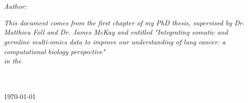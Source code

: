 \documentclass[
12pt, %
english, %
onehalfspacing,  %
nolistspacing, %
liststotoc, %
headsepline, %
]{MastersDoctoralThesis} %
\author{Aurélie \textsc{Gabriel}} %
\begin{document}

\mainmatter %
\pagestyle{thesis} %


\begin{titlepage}
\begin{center}

\vspace*{.06\textheight}


\HRule \\[0.4cm] %
{\huge \bfseries \ttitle\par}\vspace{0.4cm} %
\HRule \\[1.5cm] %
 

\begin{flushright} \large
\emph{Author:}\\
\authorname %
\end{flushright}

\vspace{3cm} 
\vfill

\large \textit{This document comes from the first chapter of my PhD thesis, supervised by Dr. Matthieu Foll and Dr. James McKay and entitled "Integrating somatic and germline multi-omics data to improve our understanding of lung cancer: a computational biology perspective"}\\[0.3cm] %
\textit{in the}\\[0.4cm]
\groupname\\\deptname\\[2cm] %
 
\vfill

{\large \today}\\[4cm] %
 
\vfill
\end{center}
\end{titlepage}
\end{document}
